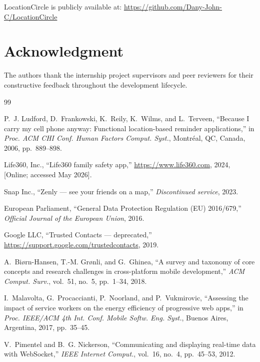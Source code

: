 \documentclass[conference]{IEEEtran}
\begin{document}
LocationCircle is publicly available at:
\url{https://github.com/Dany-John-C/LocationCircle}

\section*{Acknowledgment}

The authors thank the internship project supervisors and peer
reviewers for their constructive feedback throughout the development
lifecycle.

\balance
\begin{thebibliography}{99}

P.~J. Ludford, D.~Frankowski, K.~Reily, K.~Wilms, and L.~Terveen,
``Because I carry my cell phone anyway: Functional location-based
reminder applications,''
in \textit{Proc. ACM CHI Conf. Human Factors Comput. Syst.},
Montréal, QC, Canada, 2006, pp.~889--898.

Life360, Inc., ``Life360 family safety app,''
\url{https://www.life360.com}, 2024, [Online; accessed May 2026].

Snap Inc., ``Zenly — see your friends on a map,''
\textit{Discontinued service}, 2023.

European Parliament, ``General Data Protection Regulation (EU)
2016/679,'' \textit{Official Journal of the European Union}, 2016.

Google LLC, ``Trusted Contacts — deprecated,''
\url{https://support.google.com/trustedcontacts}, 2019.

A.~Biørn-Hansen, T.-M. Grønli, and G.~Ghinea,
``A survey and taxonomy of core concepts and research challenges in
cross-platform mobile development,''
\textit{ACM Comput. Surv.}, vol.~51, no.~5, pp.~1--34, 2018.

I.~Malavolta, G.~Procaccianti, P.~Noorland, and P.~Vukmirovic,
``Assessing the impact of service workers on the energy efficiency
of progressive web apps,''
in \textit{Proc. IEEE/ACM 4th Int. Conf. Mobile Softw. Eng. Syst.},
Buenos Aires, Argentina, 2017, pp.~35--45.

V.~Pimentel and B.~G. Nickerson,
``Communicating and displaying real-time data with WebSocket,''
\textit{IEEE Internet Comput.}, vol.~16, no.~4, pp.~45--53, 2012.


\end{thebibliography}
\end{document}
